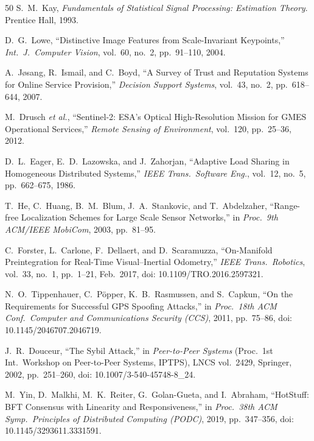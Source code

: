 \documentclass[conference,10pt]{IEEEtran}
\begin{document}
\begin{thebibliography}{50}
S.~M.~Kay,
\emph{Fundamentals of Statistical Signal Processing: Estimation Theory}.
Prentice Hall, 1993.

D.~G.~Lowe,
``Distinctive Image Features from Scale-Invariant Keypoints,''
\emph{Int.\ J.\ Computer Vision}, vol.~60, no.~2, pp.~91--110, 2004.

A.~J{\o}sang, R.~Ismail, and C.~Boyd,
``A Survey of Trust and Reputation Systems for Online Service Provision,''
\emph{Decision Support Systems}, vol.~43, no.~2, pp.~618--644, 2007.

M.~Drusch \emph{et al.},
``Sentinel-2: {ESA}'s Optical High-Resolution Mission for {GMES} Operational Services,''
\emph{Remote Sensing of Environment}, vol.~120, pp.~25--36, 2012.

D.~L.~Eager, E.~D.~Lazowska, and J.~Zahorjan,
``Adaptive Load Sharing in Homogeneous Distributed Systems,''
\emph{IEEE Trans.\ Software Eng.}, vol.~12, no.~5, pp.~662--675, 1986.

T.~He, C.~Huang, B.~M.~Blum, J.~A.~Stankovic, and T.~Abdelzaher,
``Range-free Localization Schemes for Large Scale Sensor Networks,''
in \emph{Proc.\ 9th ACM/IEEE MobiCom}, 2003, pp.~81--95.

C.~Forster, L.~Carlone, F.~Dellaert, and D.~Scaramuzza,
``On-Manifold Preintegration for Real-Time Visual--Inertial Odometry,''
\emph{IEEE Trans.\ Robotics}, vol.~33, no.~1, pp.~1--21, Feb.\ 2017,
doi: 10.1109/TRO.2016.2597321.

N.~O.~Tippenhauer, C.~P\"opper, K.~B.~Rasmussen, and S.~Capkun,
``On the Requirements for Successful GPS Spoofing Attacks,''
in \emph{Proc.\ 18th ACM Conf.\ Computer and Communications Security (CCS)}, 2011, pp.~75--86,
doi: 10.1145/2046707.2046719.

J.~R.~Douceur,
``The Sybil Attack,''
in \emph{Peer-to-Peer Systems} (Proc.\ 1st Int.\ Workshop on Peer-to-Peer Systems, IPTPS),
LNCS vol.~2429, Springer, 2002, pp.~251--260,
doi: 10.1007/3-540-45748-8\_24.

M.~Yin, D.~Malkhi, M.~K.~Reiter, G.~Golan-Gueta, and I.~Abraham,
``{HotStuff}: {BFT} Consensus with Linearity and Responsiveness,''
in \emph{Proc.\ 38th ACM Symp.\ Principles of Distributed Computing ({PODC})},
2019, pp.~347--356,
doi: 10.1145/3293611.3331591.


\end{thebibliography}
\end{document}
